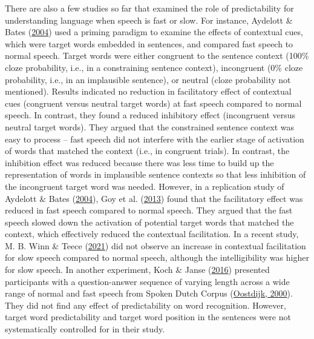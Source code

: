 \documentclass[a4paper, nobind]{templates/ociamthesis}
\begin{document}
There are also a few studies so far that examined the role of predictability for understanding language when speech is fast or slow.
For instance, Aydelott \& Bates (\protect\hyperlink{ref-Aydelott2004}{2004}) used a priming paradigm to examine the effects of contextual cues, which were target words embedded in sentences, and compared fast speech to normal speech.
Target words were either congruent to the sentence context (100\% cloze probability, i.e., in a constraining sentence context), incongruent (0\% cloze probability, i.e., in an implausible sentence), or neutral (cloze probability not mentioned). Results indicated no reduction in facilitatory effect of contextual cues (congruent versus neutral target words) at fast speech compared to normal speech.
In contrast, they found a reduced inhibitory effect (incongruent versus neutral target words).
They argued that the constrained sentence context was easy to process -- fast speech did not interfere with the earlier stage of activation of words that matched the context (i.e., in congruent trials).
In contrast, the inhibition effect was reduced because there was less time to build up the representation of words in implausible sentence contexts so that less inhibition of the incongruent target word was needed.
However, in a replication study of Aydelott \& Bates (\protect\hyperlink{ref-Aydelott2004}{2004}), Goy et al. (\protect\hyperlink{ref-Goy2013}{2013}) found that the facilitatory effect was reduced in fast speech compared to normal speech.
They argued that the fast speech slowed down the activation of potential target words that matched the context, which effectively reduced the contextual facilitation.
In a recent study, M. B. Winn \& Teece (\protect\hyperlink{ref-Winn2021b}{2021}) did not observe an increase in contextual facilitation for slow speech compared to normal speech, although the intelligibility was higher for slow speech.
In another experiment, Koch \& Janse (\protect\hyperlink{ref-Koch2016a}{2016}) presented participants with a question-answer sequence of varying length across a wide range of normal and fast speech from Spoken Dutch Corpus (\protect\hyperlink{ref-Oostdijk2000}{Oostdijk, 2000}).
They did not find any effect of predictability on word recognition. However, target word predictability and target word position in the sentences were not systematically controlled for in their study.
\end{document}
